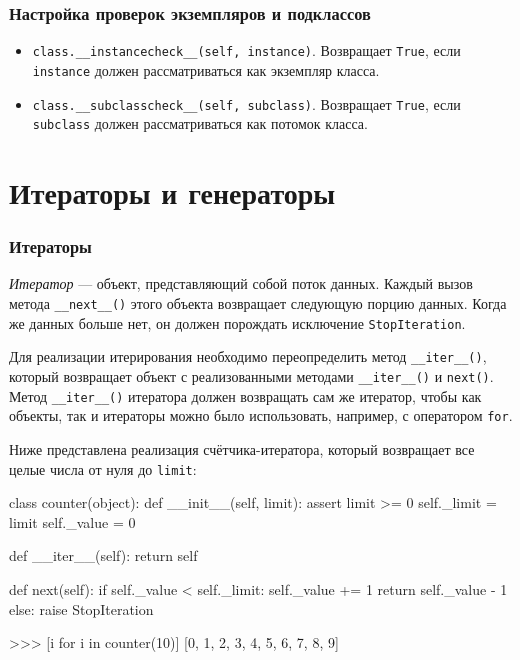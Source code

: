 \subsubsection{Настройка проверок экземпляров и подклассов}
\begin{itemize}
  \item \lstinline{class.__instancecheck__(self, instance)}. Возвращает \lstinline{True}, если \lstinline{instance} должен рассматриваться как экземпляр класса.
  \item \lstinline{class.__subclasscheck__(self, subclass)}. Возвращает \lstinline{True}, если \lstinline{subclass} должен рассматриваться как потомок класса.
\end{itemize}

\section{Итераторы и генераторы}
\label{sec:py-iterators}

\subsubsection{Итераторы}
\emph{Итератор} — объект, представляющий собой поток данных. Каждый вызов метода \lstinline{__next__()} этого объекта возвращает следующую порцию данных. Когда же данных больше нет, он должен порождать исключение \lstinline{StopIteration}.

Для реализации итерирования необходимо переопределить метод \lstinline{__iter__()}, который возвращает объект с реализованными методами \lstinline{__iter__()} и \lstinline{next()}. Метод \lstinline{__iter__()} итератора должен возвращать сам же итератор, чтобы как объекты, так и итераторы можно было использовать, например, с оператором \lstinline{for}.

Ниже представлена реализация счётчика-итератора, который возвращает все целые числа от нуля до \lstinline{limit}:
\begin{pylst}{}{}
class counter(object):
    def __init__(self, limit):
        assert limit >= 0
        self._limit = limit
        self._value = 0

    def __iter__(self):
        return self

    def next(self):
        if self._value < self._limit:
            self._value += 1
            return self._value - 1
        else:
            raise StopIteration

>>> [i for i in counter(10)]
[0, 1, 2, 3, 4, 5, 6, 7, 8, 9]
\end{pylst}

